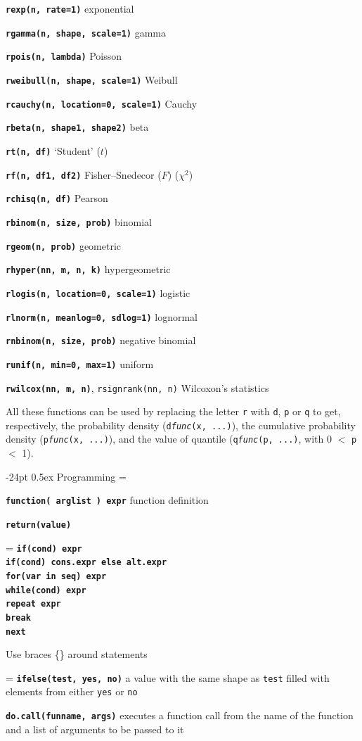 \documentclass[10pt,landscape]{article}
\makeatletter
\renewcommand\section{\@startsection{section}{1}{0mm}%
                                     {-24pt}%
                                     {0.5ex}%
                                {\color{blue}\normalfont\large\bfseries}}
\newcommand{\code}{\texttt}
\newcommand{\bcode}[1]{\texttt{\textbf{#1}}}
\makeatother
\begin{document}
\begin{multicols*}{3}
\bcode{rexp(n, rate=1)} exponential

\bcode{rgamma(n, shape, scale=1)} gamma  

\bcode{rpois(n, lambda)} Poisson

\bcode{rweibull(n, shape, scale=1)} Weibull

\bcode{rcauchy(n, location=0, scale=1)} Cauchy  

\bcode{rbeta(n, shape1, shape2)} beta

\bcode{rt(n, df)} `Student' ($t$)  

\bcode{rf(n, df1, df2)} Fisher--Snedecor ($F$)  ($\chi^2$)  

\bcode{rchisq(n, df)} Pearson 

\bcode{rbinom(n, size, prob)} binomial  

\bcode{rgeom(n, prob)} geometric  

\bcode{rhyper(nn, m, n, k)} hypergeometric  

\bcode{rlogis(n, location=0, scale=1)} logistic  

\bcode{rlnorm(n, meanlog=0, sdlog=1)} lognormal  

\bcode{rnbinom(n, size, prob)} negative binomial  

\bcode{runif(n, min=0, max=1)} uniform  

\bcode{rwilcox(nn, m, n)}, \code{rsignrank(nn, n)} Wilcoxon's statistics  

All these functions can be used by replacing the letter \code{r} with
\code{d}, \code{p} or \code{q} to get, respectively, the probability
density (\code{d\textsl{func}(x, ...)}), the cumulative probability
density (\code{p\textsl{func}(x, ...)}), and the value of quantile
(\code{q\textsl{func}(p, ...)}, with 0 $<$ \code{p} $<$ 1).





\section{Programming}
\everypar={\hangindent=9mm}

\bcode{function( arglist ) expr} function definition

\bcode{return(value)}

\everypar={\hangindent=0mm}
\bcode{if(cond) expr\\
if(cond) cons.expr  else  alt.expr\\
for(var in seq) expr\\
while(cond) expr\\
repeat expr\\
break\\
next}

Use braces \{\} around statements


\everypar={\hangindent=9mm}
\bcode{ifelse(test, yes, no)} a value with the same shape as \code{test} filled with elements
from either \code{yes} or \code{no} 

\bcode{do.call(funname, args)} executes a function call from the name of
  the function and a list of arguments to be passed to it

\end{multicols*}
\end{document}
